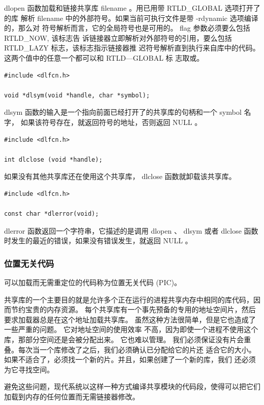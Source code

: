 dlopen 函数加载和链接共享库 filename 。用已用带 RTLD\_GLOBAL 选项打开了的库
解析 filename 中的外部符号。如果当前可执行文件是带 -rdynamic 选项编译的，那么对
符号解析而言，它的全局符号也是可用的。 flag 参数必须要么包括 RTLD\_NOW, 该标志告
诉链接器立即解析对外部符号的引用，要么包括 RTLD\_LAZY 标志，该标志指示链接器推
迟符号解析直到执行来自库中的代码。这两个值中的任意一个都可以和 RTLD—GLOBAL 标
志取或。

\begin{lstlisting}[style=CStyle]
#include <dlfcn.h>

void *dlsym(void *handle, char *symbol);
\end{lstlisting}

dlsym 函数的输入是一个指向前面已经打开了的共享库的句柄和一个 symbol 名字，
如果该符号存在，就返回符号的地址，否则返回 NULL 。

\begin{lstlisting}[style=CStyle]
#include <dlfcn.h>

int dlclose (void *handle);
\end{lstlisting}

如果没有其他共享库还在使用这个共享库， dlclose 函数就卸载该共享库。

\begin{lstlisting}[style=CStyle]
#include <dlfcn.h>

const char *dlerror(void);
\end{lstlisting}

dlerror 函数返回一个字符串，它描述的是调用 dlopen 、 dlsym 或者 dlclose 函数
时发生的最近的错误，如果没有错误发生，就返回 NULL 。

\subsubsection{位置无关代码}

可以加载而无需重定位的代码称为位置无关代码 (PIC)。

共享库的一个主要目的就是允许多个正在运行的进程共享内存中相同的库代码，因而节约宝贵的内存资源。
每个共享库有一个事先预备的专用的地址空间片，然后要求加载器总是在这个地址加载共享库。
虽然这种方法很简单，但是它也造成了一些严重的问题。 它对地址空间的使用效率
不高，因为即使一个进程不使用这个库，那部分空间还是会被分配出来。 它也难以管理。
我们必须保证没有片会重叠。每次当一个库修改了之后，我们必须确认已分配给它的片还
适合它的大小。如果不适合了，必须找一个新的片。并且，如果创建了一个新的库，我们
还必须为它寻找空间。

避免这些问题，现代系统以这样一种方式编译共享模块的代码段，使得可以把它们加载到内存的任何位置而无需链接器修改。

